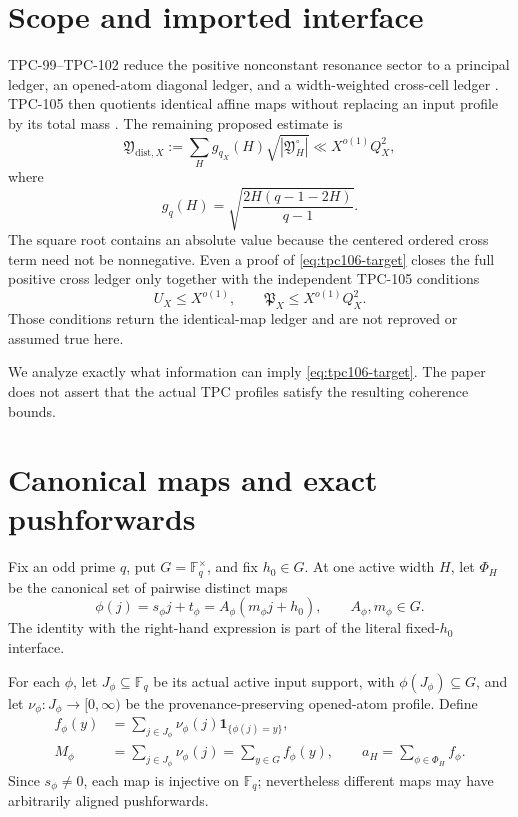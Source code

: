 \documentclass[11pt]{article}
\theoremstyle{remark}
\newcommand{\F}{\mathbb F}
\newcommand{\one}{\mathbf 1}
\newcommand{\Xdist}{\mathfrak Y_{\mathrm{dist},X}}
\newcommand{\YH}{\mathfrak Y_H^\circ}
\begin{document}
\section{Scope and imported interface}

TPC-99--TPC-102 reduce the positive nonconstant resonance sector to
a principal ledger, an opened-atom diagonal ledger, and a
width-weighted cross-cell ledger
\citep{WangTPC99,WangTPC101,WangTPC102}.  TPC-105 then quotients
identical affine maps without replacing an input profile by its
total mass \citep{WangTPC105}.  The remaining proposed estimate is
\begin{equation}
 \Xdist
 :=
 \sum_Hg_{q_X}(H)
 \sqrt{|\YH|}
 \ll X^{o(1)}Q_X^2,
\label{eq:tpc106-target}
\end{equation}
where
\[
 g_q(H)
 =
 \sqrt{\frac{2H(q-1-2H)}{q-1}}.
\]
The square root contains an absolute value because the centered
ordered cross term need not be nonnegative.
Even a proof of \eqref{eq:tpc106-target} closes the full positive
cross ledger only together with the independent TPC-105 conditions
\[
 U_X\le X^{o(1)},\qquad
 \mathfrak P_X\le X^{o(1)}Q_X^2.
\]
Those conditions return the identical-map ledger and are not
reproved or assumed true here.

We analyze exactly what information can imply
\eqref{eq:tpc106-target}.  The paper does not assert that the actual
TPC profiles satisfy the resulting coherence bounds.

\section{Canonical maps and exact pushforwards}

Fix an odd prime \(q\), put \(G=\F_q^\times\), and fix
\(h_0\in G\).  At one active width \(H\), let \(\Phi_H\) be the
canonical set of pairwise distinct maps
\begin{equation}
 \phi(j)=s_\phi j+t_\phi
 =A_\phi(m_\phi j+h_0),
 \qquad A_\phi,m_\phi\in G.
\label{eq:physical-map}
\end{equation}
The identity with the right-hand expression is part of the literal
fixed-\(h_0\) interface.

For each \(\phi\), let \(J_\phi\subseteq\F_q\) be its actual active
input support, with \(\phi(J_\phi)\subseteq G\), and let
\(\nu_\phi:J_\phi\to[0,\infty)\) be the provenance-preserving
opened-atom profile.  Define
\begin{align}
 f_\phi(y)
 &=
 \sum_{j\in J_\phi}
 \nu_\phi(j)\one_{\{\phi(j)=y\}},
\label{eq:pushforward}\\
 M_\phi&=\sum_{j\in J_\phi}\nu_\phi(j)
       =\sum_{y\in G}f_\phi(y),
\qquad
 a_H=\sum_{\phi\in\Phi_H}f_\phi.
\label{eq:masses}
\end{align}
Since \(s_\phi\ne0\), each map is injective on \(\F_q\); nevertheless
different maps may have arbitrarily aligned pushforwards.
\end{document}
